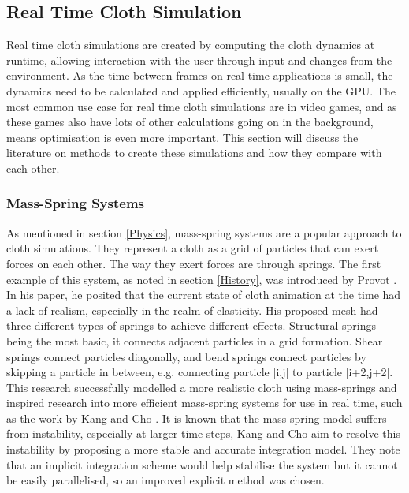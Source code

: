 \documentclass[12pt,a4paper]{article}
\begin{document}
\subsection{Real Time Cloth Simulation}
Real time cloth simulations are created by computing the cloth dynamics at runtime, allowing interaction with the user through input and changes from the environment. As the time between frames on real time applications is small, the dynamics need to be calculated and applied efficiently, usually on the GPU. The most common use case for real time cloth simulations are in video games, and as these games also have lots of other calculations going on in the background, means optimisation is even more important. This section will discuss the literature on methods to create these simulations and how they compare with each other. \\
\subsubsection{Mass-Spring Systems}
\label{Mass-Spring}
As mentioned in section \ref{Physics}, mass-spring systems are a popular approach to cloth simulations. They represent a cloth as a grid of particles that can exert forces on each other. The way they exert forces are through springs. The first example of this system, as noted in section \ref{History}, was introduced by Provot \cite{provot1995deformation}.\\

In his paper, he posited that the current state of cloth animation at the time had a lack of realism, especially in the realm of elasticity. His proposed mesh had three different types of springs to achieve different effects. Structural springs being the most basic, it connects adjacent particles in a grid formation. Shear springs connect particles diagonally, and bend springs connect particles by skipping a particle in between, e.g. connecting particle [i,j] to particle [i+2,j+2]. \\

This research successfully modelled a more realistic cloth using mass-springs and inspired research into more efficient mass-spring systems for use in real time, such as the work by Kang and Cho \cite{kang2012photorealistic}. It is known that the mass-spring model suffers from instability, especially at larger time steps, Kang and Cho aim to resolve this instability by proposing a more stable and accurate integration model. They note that an implicit integration scheme would help stabilise the system but it cannot be easily parallelised, so an improved explicit method was chosen. \\
\end{document}
